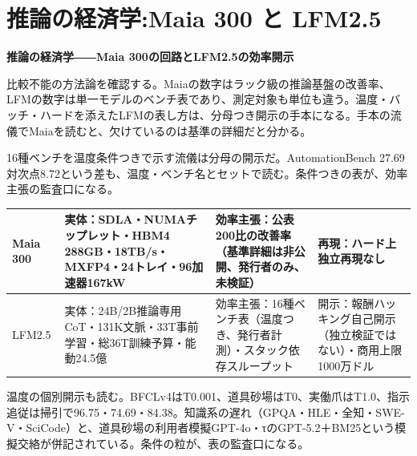 \documentclass[lualatex,a4paper,10pt]{jlreq}
\begin{document}
\section{推論の経済学:Maia 300 と LFM2.5}
\label{sec:P2}
{\Large\bfseries 推論の経済学――Maia 300の回路とLFM2.5の効率開示\par}
\bigskip
比較不能の方法論を確認する。Maiaの数字はラック級の推論基盤の改善率、LFMの数字は単一モデルのベンチ表であり、測定対象も単位も違う。温度・バッチ・ハードを添えたLFMの表し方は、分母つき開示の手本になる。手本の流儀でMaiaを読むと、欠けているのは基準の詳細だと分かる。
\cite{B09,B66,B10,B67,B68,B11,B69,B12}

16種ベンチを温度条件つきで示す流儀は分母の開示だ。AutomationBench 27.69対次点8.72という差も、温度・ベンチ名とセットで読む。条件つきの表が、効率主張の監査口になる。
\cite{B11,B69,B12}

\begin{strip}
\centering\footnotesize
{}
\begin{tabularx}{0.96\linewidth}{@{}lXXX@{}}
\toprule
Maia 300 & 実体：SDLA・NUMAチップレット・HBM4 288GB・18TB/s・MXFP4・24トレイ・96加速器167kW & 効率主張：公表200比の改善率（基準詳細は非公開、発行者のみ、未検証） & 再現：ハード上独立再現なし \cite{B09,B66,B10,B67} \\
\midrule
LFM2.5 & 実体：24B/2B推論専用CoT・131K文脈・33T事前学習・総36T訓練予算・能動24.5億 & 効率主張：16種ベンチ表（温度つき、発行者計測）・スタック依存スループット & 開示：報酬ハッキング自己開示（独立検証ではない）・商用上限1000万ドル \cite{B11,B69,B12} \\
\bottomrule
\end{tabularx}
\end{strip}

温度の個別開示も読む。BFCLv4はT0.001、道具砂場はT0、実働爪はT1.0、指示追従は掃引で96.75・74.69・84.38。知識系の遅れ（GPQA・HLE・全知・SWE-V・SciCode）と、道具砂場の利用者模擬GPT-4o・τのGPT-5.2＋BM25という模擬交絡が併記されている。条件の粒が、表の監査口になる。
\cite{B11,B69,B12}
\end{document}
